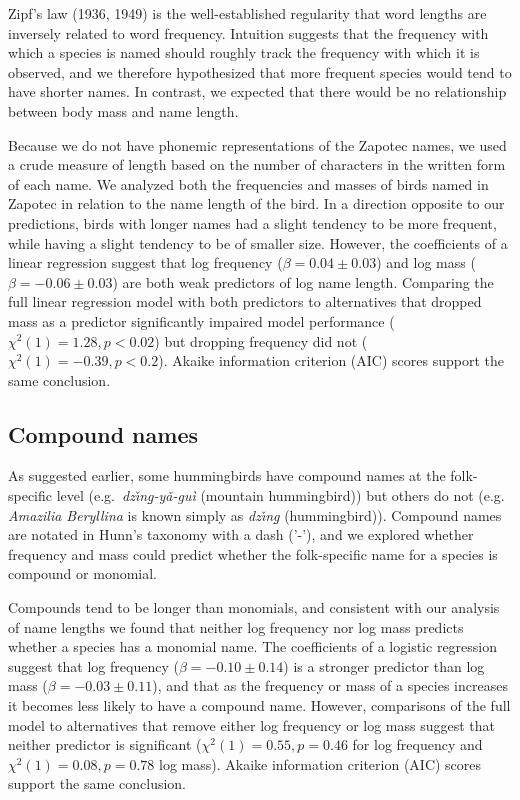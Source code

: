 \documentclass[10pt,letterpaper]{article}
\begin{document}
Zipf's law (1936, 1949)\nocite{zipf1936psycho,zipf1949human} is the well-established regularity that word lengths are  inversely related to word frequency. Intuition suggests that the frequency with which a species is named should roughly track the frequency with which it is observed, and we therefore hypothesized that more frequent species would tend to have shorter names.  In contrast, we expected that there would be no relationship between body mass and name length. 

Because we do not have phonemic representations of the Zapotec names, we used a crude measure of length based on the number of characters in the written form of each name. We analyzed both the frequencies and masses of birds named in Zapotec in relation to the name length of the bird. In a direction opposite to our predictions, birds with longer names had a slight tendency to be more frequent, while having a slight tendency to be of smaller size. However, the coefficients of a linear regression suggest that log frequency ($\beta = 0.04 \pm 0.03$) and log mass ($\beta = -0.06 \pm 0.03$) are both weak predictors of log name length. Comparing the full linear regression model with both predictors to alternatives that dropped mass as a predictor significantly impaired model performance ($\chi^{2}(1) = 1.28, p < 0.02$) but dropping frequency did not ($\chi^{2}(1) = -0.39, p < 0.2$). Akaike information criterion (AIC) scores support the same conclusion.


\subsection{Compound names}

As suggested earlier, some hummingbirds have compound names at the folk-specific level (e.g.\ \textit{dz\v{\i}n\b{g}-y\v{a}-gu\`{i}} (mountain hummingbird)) but others do not (e.g.\   
\emph{ Amazilia Beryllina} is known simply as \textit{dz\v{\i}n\b{g}} (hummingbird)). Compound names are notated in Hunn's taxonomy with a dash ('-'), and we explored whether frequency and mass could predict whether the folk-specific name for a species is compound or monomial. 


Compounds tend to be longer than monomials, and consistent with our analysis of name lengths we found 
that neither log frequency nor log mass predicts whether a species has a monomial name. The coefficients of a logistic regression suggest that log frequency ($\beta = -0.10 \pm 0.14$) is a stronger predictor than log mass ($\beta = -0.03 \pm 0.11$), and that as the frequency or mass of a species increases it becomes less likely to have a compound name. However, comparisons of the full model to alternatives that remove either log frequency or log mass  suggest that neither predictor is significant ($\chi^{2}(1) = 0.55, p = 0.46$ for log frequency and $\chi^{2}(1) = 0.08, p = 0.78$ log mass).  Akaike information criterion (AIC) scores support the same conclusion. 
\end{document}
